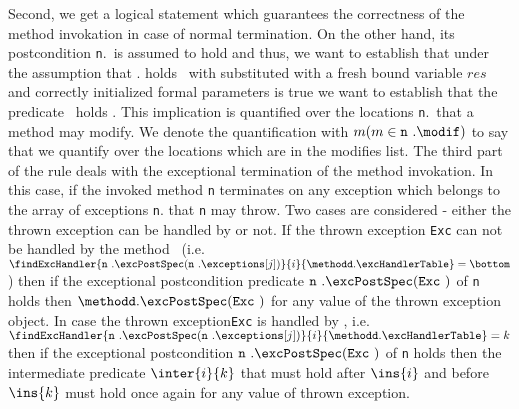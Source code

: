\begin{itemize}
						Second, we get a logical statement which guarantees the correctness of the method invokation
						in case of normal termination.
						On the other hand, its postcondition \mbox{\rm\texttt{n}}.\normalPost \ is assumed to hold and thus, we want to establish that 
						under the assumption that \methodd.\normalPost{}  holds \ with \result{} substituted with a fresh bound variable $ res$
						and correctly initialized formal parameters
						is true we want to establish that the predicate  \
						holds . This implication is quantified over the locations \mbox{\rm\texttt{n}}.\modif \ that a method may modify.
						We denote the quantification with $ m ( m \in \mbox{\rm\texttt{n} } .\modif ) $ to say that we quantify over the locations 
						which are in the modifies list.
						The third part of the rule deals with the exceptional termination of the method invokation.
						In this case, if the invoked method \texttt{n} terminates on any exception which belongs to the array of 
						exceptions \texttt{n}.\exceptions{} that \texttt{n} may throw. Two cases are considered - either the thrown
						exception can be handled by \methodd{} or not. If the thrown exception  \texttt{Exc} can not be handled
						by the method \methodd \
						(i.e. $\findExcHandler{ \mbox{\rm\texttt{n} }.\excPostSpec ( \mbox{\rm\texttt{n} }.\exceptions[j])  }{i}
						{\methodd.\excHandlerTable} = \bottom $) then if the exceptional postcondition predicate
						$ \mbox{\rm\texttt{n} }.\excPostSpec ( \mbox{\rm\texttt{Exc} })  $ of \texttt{n} holds
						then  	$ \methodd.\excPostSpec ( \mbox{\rm\texttt{Exc} })  $ for any value of the thrown exception
						object. 
						In case the thrown  exception\texttt{Exc} is handled by \methodd, i.e.
						$ \findExcHandler{ \mbox{\rm\texttt{n} }.\excPostSpec 
						  ( \mbox{\rm\texttt{n} }.\exceptions[j])  }{i}{\methodd.\excHandlerTable} = k $   then if 
						the exceptional postcondition $ \mbox{\rm\texttt{n} }.\excPostSpec ( \mbox{\rm\texttt{Exc} })  $ 
						of \texttt{n} holds then the intermediate predicate $\inter{i}{k}$ 
						that must hold after $\ins{i}$ and before   $\ins{k}$ must hold once again for any value
						of thrown exception. 
						

\end{itemize}
